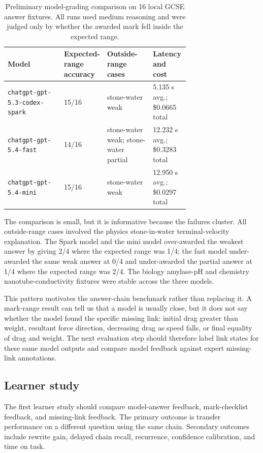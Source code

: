 \documentclass[11pt]{article}
\begin{document}
\begin{table}[H]
\centering
\small
\begin{tabularx}{\linewidth}{L{0.31\linewidth}L{0.20\linewidth}Y L{0.20\linewidth}}
\toprule
\textbf{Model} & \textbf{Expected-range accuracy} & \textbf{Outside-range cases} & \textbf{Latency and cost}\\
\midrule
\texttt{chatgpt-gpt-5.3-codex-spark} & 15/16 & stone-water weak & 5.135 s avg.; \$0.0665 total\\
\texttt{chatgpt-gpt-5.4-fast} & 14/16 & stone-water weak; stone-water partial & 12.232 s avg.; \$0.3283 total\\
\texttt{chatgpt-gpt-5.4-mini} & 15/16 & stone-water weak & 12.950 s avg.; \$0.0297 total\\
\bottomrule
\end{tabularx}
\caption{Preliminary model-grading comparison on 16 local GCSE answer fixtures. All runs used medium reasoning and were judged only by whether the awarded mark fell inside the expected range.}
\label{tab:modelgrading}
\end{table}

The comparison is small, but it is informative because the failures cluster. All outside-range cases involved the physics stone-in-water terminal-velocity explanation. The Spark model and the mini model over-awarded the weakest answer by giving 2/4 where the expected range was 1/4; the fast model under-awarded the same weak answer at 0/4 and under-awarded the partial answer at 1/4 where the expected range was 2/4. The biology amylase-pH and chemistry nanotube-conductivity fixtures were stable across the three models.

This pattern motivates the answer-chain benchmark rather than replacing it. A mark-range result can tell us that a model is usually close, but it does not say whether the model found the specific missing link: initial drag greater than weight, resultant force direction, decreasing drag as speed falls, or final equality of drag and weight. The next evaluation step should therefore label link states for these same model outputs and compare model feedback against expert missing-link annotations.

\subsection{Learner study}

The first learner study should compare model-answer feedback, mark-checklist feedback, and missing-link feedback. The primary outcome is transfer performance on a different question using the same chain. Secondary outcomes include rewrite gain, delayed chain recall, recurrence, confidence calibration, and time on task.
\end{document}
